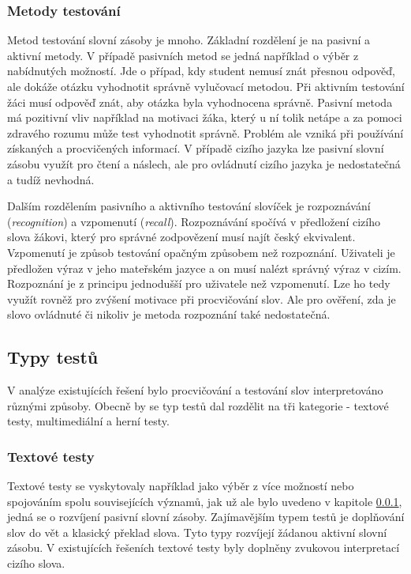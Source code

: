 \documentclass[a4paper,11pt,titlepage,fleqn]{article}
\begin{document}
        \subsubsection{Metody testování}
            \label{test-methods}

            Metod testování slovní zásoby je mnoho. Základní rozdělení je na pasivní a aktivní metody. V případě pasivních metod se jedná například o výběr z nabídnutých možností. Jde o případ, kdy student nemusí znát přesnou odpověď, ale dokáže otázku vyhodnotit správně vylučovací metodou. Při aktivním testování žáci musí odpověď znát, aby otázka byla vyhodnocena správně. Pasivní metoda má pozitivní vliv například na motivaci žáka, který u ní tolik netápe a za pomoci zdravého rozumu může test vyhodnotit správně. Problém ale vzniká při používání získaných a procvičených informací. V případě cizího jazyka lze pasivní slovní zásobu využít pro čtení a náslech, ale pro ovládnutí cizího jazyka je nedostatečná a tudíž nevhodná. 

            Dalším rozdělením pasivního a aktivního testování slovíček je rozpoznávání (\textit{recognition}) a vzpomenutí (\textit{recall}). Rozpoznávání spočívá v předložení cizího slova žákovi, který pro správné zodpovězení musí najít český ekvivalent. Vzpomenutí je způsob testování opačným způsobem než rozpoznání. Uživateli je předložen výraz v jeho mateřském jazyce a on musí nalézt správný výraz v cizím. Rozpoznání je z principu jednodušší pro uživatele než vzpomenutí. Lze ho tedy využít rovněž pro zvýšení motivace při procvičování slov. Ale pro ověření, zda je slovo ovládnuté či nikoliv je metoda rozpoznání také nedostatečná.

        \subsection{Typy testů}

            V analýze existujících řešení bylo procvičování a testování slov interpretováno různými způsoby. Obecně by se typ testů dal rozdělit na tři kategorie - textové testy, multimediální a herní testy.

            \subsubsection{Textové testy}
                Textové testy se vyskytovaly například jako výběr z více možností nebo spojováním spolu souvisejících významů, jak už ale bylo uvedeno v kapitole \ref{test-methods}, jedná se o rozvíjení pasivní slovní zásoby. Zajímavějším typem testů je doplňování slov do vět a klasický překlad slova. Tyto typy rozvíjejí žádanou aktivní slovní zásobu. V existujících řešeních textové testy byly doplněny zvukovou interpretací cizího slova.
\end{document}
